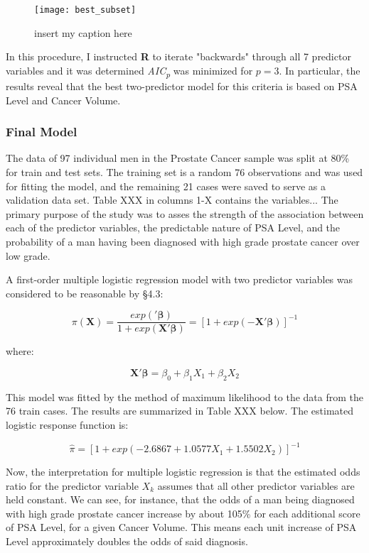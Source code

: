 \begin{figure}[H]
	\centering
	\texttt{[image: best\_subset]}
	\caption{insert my caption here}
\end{figure}

In this procedure, I instructed \textbf{R} to iterate "backwards" through all 7 predictor variables and it was determined \textit{AIC\textsubscript{p}} was minimized for \(p=3\). In particular, the results reveal that the best two-predictor model for this criteria is based on PSA Level and Cancer Volume.


\subsubsection{Final Model}
The data of 97 individual men in the Prostate Cancer sample was split at 80\% for train and test sets. The training set is a random 76 observations and was used for fitting the model, and the remaining 21 cases were saved to serve as a validation data set. Table XXX in columns 1-X contains the variables... The primary purpose of the study was to asses the strength of the association between each of the predictor variables, the predictable nature of PSA Level, and the probability of a man having been diagnosed with high grade prostate cancer over low grade. \par

A first-order multiple logistic regression model with two predictor variables was considered to be reasonable by \S4.3: 

\begin{equation}
\pi(\textbf{X}) = \frac{exp('\boldsymbol{\beta})}{1+exp(\textbf{X}'\boldsymbol{\beta})} = [1+exp(-\textbf{X}'\boldsymbol{\beta})]^{-1}
\end{equation}

where:

\begin{equation}
\textbf{X}'\boldsymbol{\beta} = \beta_0+\beta_1X_1+\beta_2X_2
\end{equation}

This model was fitted by the method of maximum likelihood to the data from the 76 train cases. The results are summarized in Table XXX below. The estimated logistic response function is:

\begin{equation}
\hat{\pi}=[ 1+ exp(-2.6867 + 1.0577X_1 + 1.5502X_2)]^{-1}
\end{equation}

Now, the interpretation for multiple logistic regression is that the estimated odds ratio for the predictor variable \(X_k\) assumes that all other predictor variables are held constant. We can see, for instance, that the odds of a man being diagnosed with high grade prostate cancer increase by about 105\% for each additional score of PSA Level, for a given Cancer Volume. This means each unit increase of PSA Level approximately doubles the odds of said diagnosis. 

